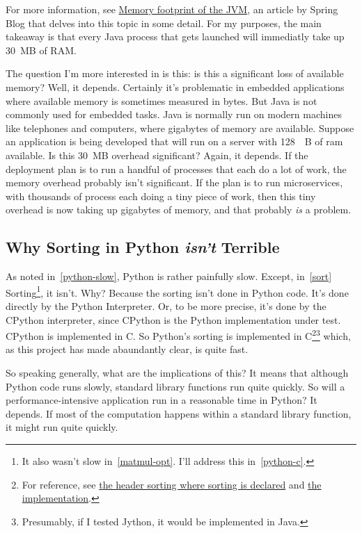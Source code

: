 \documentclass[12pt,letterpaper]{article}
\begin{document}
For more information, see
\href{https://spring.io/blog/2019/03/11/memory-footprint-of-the-jvm}{Memory
footprint of the JVM}, an article by Spring Blog that delves into this topic in
some detail. For my purposes, the main takeaway is that every Java process that
gets launched will immediatly take up \SI{30}{\mega B} of RAM.

The question I'm more interested in is this: is this a significant loss of
available memory? Well, it depends. Certainly it's problematic in embedded
applications where available memory is sometimes measured in bytes. But Java is
not commonly used for embedded tasks. Java is normally run on modern machines
like telephones and computers, where gigabytes of memory are available. Suppose
an application is being developed that will run on a server with \SI{128}{\giga
B} of ram available. Is this \SI{30}{\mega B} overhead significant? Again, it
depends. If the deployment plan is to run a handful of processes that each do
a lot of work, the memory overhead probably isn't significant. If the plan is
to run microservices, with thousands of process each doing a tiny piece of
work, then this tiny overhead is now taking up gigabytes of memory, and that
probably \emph{is} a problem.

\subsection{Why Sorting in Python \emph{isn't} Terrible}

As noted in~\ref{python-slow}, Python is rather painfully slow. Except,
in~\ref{sort} Sorting\footnote{It also wasn't slow in~\ref{matmul-opt}. I'll
address this in~\ref{python-c}.}, it isn't. Why? Because the sorting isn't done
in Python code. It's done directly by the Python Interpreter. Or, to be more
precise, it's done by the CPython interpreter, since CPython is the Python
implementation under test. CPython is implemented in C. So Python's sorting is
implemented in C\footnote{For reference, see
\href{https://github.com/python/cpython/blob/f348154c8f8a9c254503306c59d6779d4d09b3a9/Include/listobject.h#L39}{the
header sorting where sorting is declared} and
\href{https://github.com/python/cpython/blob/f348154c8f8a9c254503306c59d6779d4d09b3a9/Objects/listobject.c#L2567-L2579}{the
implementation}.}\footnote{Presumably, if I tested Jython, it would be
implemented in Java.} which, as this project has made abaundantly clear, is
quite fast.

So speaking generally, what are the implications of this? It means that
although Python code runs slowly, standard library functions run quite quickly.
So will a performance-intensive application run in a reasonable time in Python?
It depends. If most of the computation happens within a standard library
function, it might run quite quickly.
\end{document}
